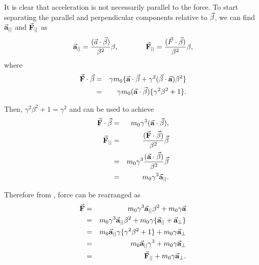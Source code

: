 \documentclass[a4paper,oneside,12pt]{report}
\numberwithin{equation}{chapter}
\begin{document}
It is clear that acceleration is not necessarily parallel to the force. 
To start separating the parallel and perpendicular components relative to $\vec{\beta}$, we can find $\vec{\textbf{a}}_{||}$ and $\vec{\textbf{F}}_{||}$ as
\vspace{-10pt}
\begin{equation} \label{eq:a_F_parallels}
    \begin{aligned}
        \vecthreeBF{a}_{||} = \frac{(\dotProd{a}{\beta})}{\beta^2}\beta  ,
    \end{aligned}
    \qquad \qquad
    \begin{aligned}
        \vecthreeBF{F}_{||} = \frac{(\dotProd{F}{\beta})}{\beta^2}\beta  ,
    \end{aligned}
    \vspace{-10pt}
\end{equation}
where 
\vspace{-17pt}
\begin{eqnarray}
    \vec{\textbf{F}} \cdot \vec{\beta} &=& \gamma m_0 \{ \vec{\textbf{a}} \cdot \vec{\beta} + \gamma^2(\vec{\beta} \cdot \vec{\textbf{a}})\beta^2 \} \nonumber\\
                                &=& \gamma m_0 (\vec{\textbf{a}} \cdot \vec{\beta}) \{ \gamma^2\beta^2  + 1\} .
\end{eqnarray}

\vspace{-40pt}
\noindent
Then, $\gamma^2 \beta^2 + 1 = \gamma^2 $ and  can be used to achieve
\vspace{-20pt}
\begin{eqnarray}
    \vec{\textbf{F}} \cdot \vec{\beta} &=& m_0 \gamma^3 (\vec{\textbf{a}} \cdot \vec{\beta} )   , \nonumber \\
    \vec{\textbf{F}}_{||} &=& \frac{(\vec{\textbf{F}} \cdot \vec{\beta})}{\beta^2} \vec{\beta} \nonumber \\
                        &=& m_0 \gamma^3 \frac{(\vec{\textbf{a}} \cdot \vec{\beta} )}{\beta^2} \vec{\beta} \nonumber \\
                        &=& m_0 \gamma^3 \vec{\textbf{a}}_{||} . \label{eq:Frel_parallel}
\end{eqnarray}

\vspace{-41pt}
\noindent
Therefore from , force can be rearranged as
\vspace{-20pt}
\begin{eqnarray}
    \vec{\textbf{F}}  &=& m_0 \gamma^3 \vec{\textbf{a}}_{||} \beta^2 + m_0 \gamma \vec{\textbf{a}} \nonumber\\
                    &=& m_0 \gamma^3 \vec{\textbf{a}}_{||} \beta^2 + m_0 \gamma \{ \vec{\textbf{a}}_{||} +  \vec{\textbf{a}}_{\perp} \} \nonumber\\
                    &=& m_0 \vec{\textbf{a}}_{||} \gamma \{ \gamma^2\beta^2 + 1 \} + m_0 \gamma \vec{\textbf{a}}_{\perp} \nonumber\\
                    &=& m_0 \vec{\textbf{a}}_{||} \gamma^3 + m_0 \gamma \vec{\textbf{a}}_{\perp} \nonumber\\
                    &=& \vec{\textbf{F}}_{||} + m_0 \gamma \vec{\textbf{a}}_{\perp} .
\end{eqnarray}
\end{document}
